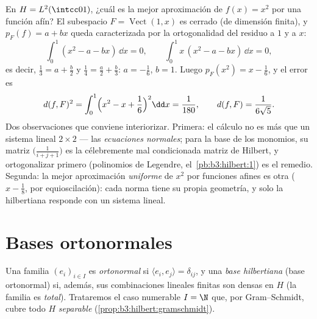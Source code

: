 \begin{example}
\label{ex:b3:hilbert:projectionexample}
En $H = L^2(\intcc01)$, ¿cuál es la mejor aproximación de $f(x) = x^2$
por una función afín? El subespacio $F =
\operatorname{Vect}(1, x)$ es cerrado (de dimensión finita), y
$p_F(f) = a + bx$ queda caracterizada por la ortogonalidad del residuo a
$1$ y a $x$:
\[
\int_0^1(x^2 - a - bx)\,\dd x = 0,
\qquad
\int_0^1x\,(x^2 - a - bx)\,\dd x = 0,
\]
es decir, $\frac13 = a + \frac b2$ y $\frac14 = \frac a2 +
\frac b3$: $a = -\frac16$, $b = 1$. Luego $p_F(x^2) = x -
\frac16$, y el error es
\[
d(f, F)^2 = \int_0^1\Bigl(x^2 - x + \frac16\Bigr)^2\dd x =
\frac1{180},
\qquad d(f, F) = \frac1{6\sqrt5} .
\]
Dos observaciones que conviene interiorizar. Primera: el cálculo no es
más que un sistema lineal $2\times2$ --- las \emph{ecuaciones normales};
para la base de los monomios, su matriz $\bigl(\frac1{i+j+1}\bigr)$ es
la célebremente mal condicionada matriz de Hilbert, y ortogonalizar
primero (polinomios de Legendre, el~\cref{pb:b3:hilbert:1}) es el
remedio. Segunda: la mejor aproximación \emph{uniforme} de $x^2$ por
funciones afines es otra ($x - \frac18$, por equioscilación): cada norma
tiene su propia geometría, y solo la hilbertiana responde con un sistema
lineal.
\end{example}

\section{Bases ortonormales}

\begin{definition}\label{def:b3:hilbert:onb}
Una familia $(e_i)_{i\in I}$ es \emph{ortonormal} si $\langle
e_i, e_j\rangle = \delta_{ij}$, y una \emph{base hilbertiana} (base ortonormal) si, además, sus combinaciones lineales
finitas son densas en $H$ (la familia es \emph{total}). Trataremos el
caso numerable $I = \N$ que, por Gram--Schmidt, cubre todo $H$
\emph{separable}
(\cref{prop:b3:hilbert:gramschmidt}).
\end{definition}

